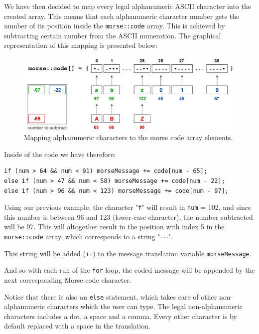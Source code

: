 \documentclass[12pt]{report}
\begin{document}
We have then decided to map every legal alphanumeric ASCII character into the created array. This means that each alphanumeric character number gets the number of its position inside the \verb|morse::code| array. This is achieved by subtracting certain number from the ASCII numeration. The graphical representation of this mapping is presented below:

\begin{figure}[H]
\centering\includegraphics[scale=0.1]{morse_code_map}
\caption{Mapping alphanumeric characters to the morse code array elements.}				
\label{fig:morse_code_map}
\end{figure}

Inside of the code we have therefore:

\begin{snugshade}
\begin{verbatim}
if (num > 64 && num < 91) morseMessage += code[num - 65];
else if (num > 47 && num < 58) morseMessage += code[num - 22];
else if (num > 96 && num < 123) morseMessage += code[num - 97];
\end{verbatim}
\end{snugshade}

Using our previous example, the character "\verb|f|" will result in \verb|num| = 102, and since this number is between 96 and 123 (lower-case character), the number subtracted will be 97. This will altogether result in the position with index 5 in the \verb|morse::code| array, which corresponds to a string "$\cdot\cdot$\text{-}$\cdot$". 

This string will be added (\verb|+=|) to the message translation variable \verb|morseMessage|.

And so with each run of the \verb|for| loop, the coded message will be appended by the next corresponding Morse code character.

Notice that there is also an \verb|else| statement, which takes care of other non-alphanumeric characters which the user can type. The legal non-alphanumeric characters includes a dot, a space and a comma. Every other character is by default replaced with a space in the translation.
\end{document}
